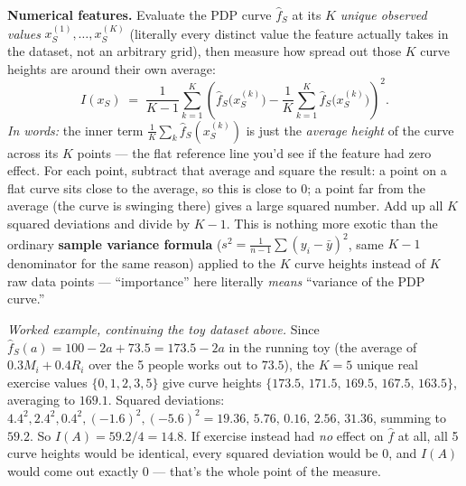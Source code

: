 \textbf{Numerical features.} Evaluate the PDP curve $\hat f_S$ at its $K$
\emph{unique observed values} $x_S^{(1)},\dots,x_S^{(K)}$ (literally every
distinct value the feature actually takes in the dataset, not an
arbitrary grid), then measure how spread out those $K$ curve heights are
around their own average:
\begin{equation}
I(x_S) \;=\; \frac{1}{K-1}\sum_{k=1}^K
\left(\hat f_S\big(x_S^{(k)}\big) - \frac{1}{K}\sum_{k=1}^K
\hat f_S\big(x_S^{(k)}\big)\right)^{\!2}.
\label{eq:pdp-importance-numeric}
\end{equation}
\noindent\textit{In words:} the inner term
$\frac1K\sum_k \hat f_S(x_S^{(k)})$ is just the \emph{average height} of
the curve across its $K$ points --- the flat reference line you'd see if
the feature had zero effect. For each point, subtract that average and
square the result: a point on a flat curve sits close to the average, so
this is close to $0$; a point far from the average (the curve is
swinging there) gives a large squared number. Add up all $K$ squared
deviations and divide by $K-1$. This is nothing more exotic than the
ordinary \textbf{sample variance formula}
($s^2=\frac1{n-1}\sum(y_i-\bar y)^2$, same $K-1$ denominator for the same
reason) applied to the $K$ curve heights instead of $K$ raw data points
--- ``importance'' here literally \emph{means} ``variance of the PDP
curve.''

\emph{Worked example, continuing the toy dataset above.} Since
$\hat f_S(a) = 100-2a+73.5 = 173.5-2a$ in the running toy (the average of
$0.3M_i+0.4R_i$ over the 5 people works out to $73.5$), the $K=5$ unique
real exercise values $\{0,1,2,3,5\}$ give curve heights
$\{173.5,\,171.5,\,169.5,\,167.5,\,163.5\}$, averaging to $169.1$. Squared
deviations: $4.4^2,2.4^2,0.4^2,(-1.6)^2,(-5.6)^2 =
19.36,\,5.76,\,0.16,\,2.56,\,31.36$, summing to $59.2$. So
$I(A) = 59.2/4 = 14.8$. If exercise instead had \emph{no} effect on
$\hat f$ at all, all 5 curve heights would be identical, every squared
deviation would be $0$, and $I(A)$ would come out exactly $0$ --- that's
the whole point of the measure.

